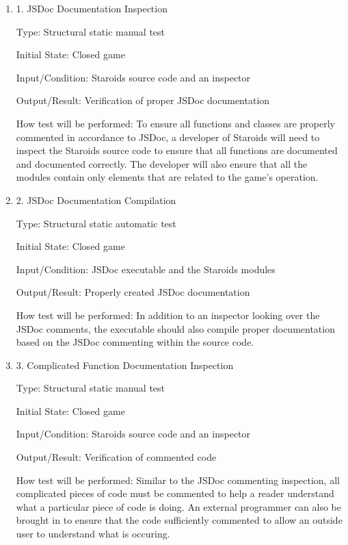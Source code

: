 \documentclass[12pt, titlepage]{article}
\begin{document}
\begin{enumerate}

\item{1. JSDoc Documentation Inspection\\}

Type: Structural static manual test

Initial State: Closed game

Input/Condition: Staroids source code and an inspector

Output/Result: Verification of proper JSDoc documentation

How test will be performed: To ensure all functions and classes are properly commented in accordance to JSDoc, a developer of Staroids will need to inspect the Staroids source code to ensure that all functions are documented and documented correctly. The developer will also ensure that all the modules contain only elements that are related to the game's operation.

\item{2. JSDoc Documentation Compilation\\}

Type: Structural static automatic test

Initial State: Closed game

Input/Condition: JSDoc executable and the Staroids modules

Output/Result: Properly created JSDoc documentation

How test will be performed: In addition to an inspector looking over the JSDoc comments, the executable should also compile proper documentation based on the JSDoc commenting within the source code.

\item{3. Complicated Function Documentation Inspection\\}

Type: Structural static manual test

Initial State: Closed game

Input/Condition: Staroids source code and an inspector

Output/Result: Verification of commented code

How test will be performed: Similar to the JSDoc commenting inspection, all complicated pieces of code must be commented to help a reader understand what a particular piece of code is doing. An external programmer can also be brought in to ensure that the code sufficiently commented to allow an outside user to understand what is occuring.

\end{enumerate}
\end{document}
